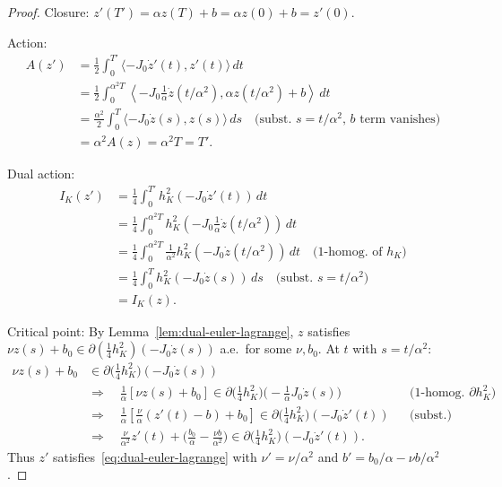 \begin{proof}
Closure: $z'(T') = \alpha z(T) + b = \alpha z(0) + b = z'(0)$.

Action:
\begin{align*}
  A(z')
  &= \frac{1}{2}\int_0^{T'} \langle -J_0 \dot{z}'(t), z'(t) \rangle\, dt \\
  &= \frac{1}{2}\int_0^{\alpha^2 T} \left\langle -J_0 \frac{1}{\alpha}\dot{z}(t/\alpha^2), \alpha z(t/\alpha^2) + b \right\rangle\, dt \\
  &= \frac{\alpha^2}{2}\int_0^{T} \langle -J_0 \dot{z}(s), z(s) \rangle\, ds
  \quad \text{(subst.\ $s = t/\alpha^2$, $b$ term vanishes)} \\
  &= \alpha^2 A(z) = \alpha^2 T = T'.
\end{align*}

Dual action:
\begin{align*}
  I_K(z')
  &= \frac{1}{4}\int_0^{T'} h_K^2(-J_0\dot{z}'(t))\, dt \\
  &= \frac{1}{4}\int_0^{\alpha^2 T} h_K^2\left(-J_0 \frac{1}{\alpha}\dot{z}(t/\alpha^2)\right)\, dt \\
  &= \frac{1}{4}\int_0^{\alpha^2 T} \frac{1}{\alpha^2} h_K^2(-J_0\dot{z}(t/\alpha^2))\, dt
  \quad \text{(1-homog.\ of $h_K$)} \\
  &= \frac{1}{4}\int_0^{T} h_K^2(-J_0\dot{z}(s))\, ds
  \quad \text{(subst.\ $s = t/\alpha^2$)} \\
  &= I_K(z).
\end{align*}

Critical point: By Lemma~\ref{lem:dual-euler-lagrange}, $z$ satisfies
$\nu z(s) + b_0 \in \partial(\tfrac{1}{4}h_K^2)(-J_0\dot{z}(s))$ a.e.\ for some
$\nu, b_0$. At $t$ with $s = t/\alpha^2$:
\begin{align*}
  \nu z(s) + b_0
  &\in \partial\bigl(\tfrac{1}{4}h_K^2\bigr)(-J_0\dot{z}(s)) \\
  &\Rightarrow \quad
  \tfrac{1}{\alpha}[\nu z(s) + b_0]
  \in \partial\bigl(\tfrac{1}{4}h_K^2\bigr)
    \bigl(-\tfrac{1}{\alpha}J_0\dot{z}(s)\bigr)
  && \text{(1-homog.\ $\partial h_K^2$)} \\
  &\Rightarrow \quad
  \tfrac{1}{\alpha}\left[\tfrac{\nu}{\alpha}(z'(t) - b) + b_0\right]
  \in \partial\bigl(\tfrac{1}{4}h_K^2\bigr)(-J_0\dot{z}'(t))
  && \text{(subst.)} \\
  &\Rightarrow \quad
  \tfrac{\nu}{\alpha^2} z'(t)
    + \bigl(\tfrac{b_0}{\alpha} - \tfrac{\nu b}{\alpha^2}\bigr)
  \in \partial\bigl(\tfrac{1}{4}h_K^2\bigr)(-J_0\dot{z}'(t)).
\end{align*}
Thus $z'$ satisfies~\eqref{eq:dual-euler-lagrange} with $\nu' = \nu/\alpha^2$
and $b' = b_0/\alpha - \nu b/\alpha^2$.
\end{proof}


